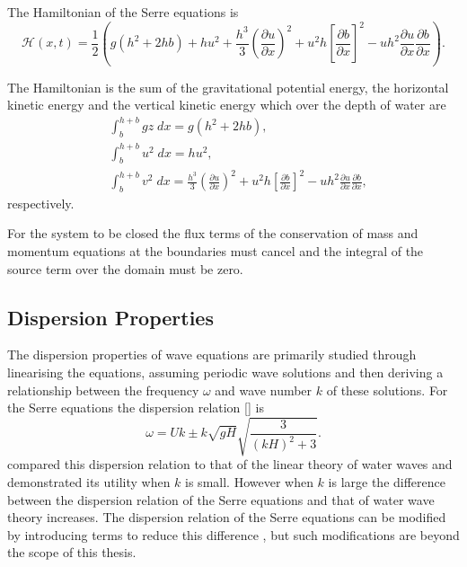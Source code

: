 \begin{defn}
	\label{eqn:Hamildef}
	The Hamiltonian \cite{Green-Naghdi-1976-237,Li-Y-2002} of the Serre equations is
	\begin{equation*}
		\mathcal{H}(x,t) = \frac{1}{2} \left( g\left(h^2 + 2hb\right) + hu^2  + \frac{h^3}{3} \left(\frac{\partial u}{\partial x}\right)^2 + u^2h\left[\frac{\partial b}{\partial x}\right]^2 - uh^2 \frac{\partial u}{\partial x} \frac{\partial b}{\partial x}  \right).
	\end{equation*}
\end{defn}
The Hamiltonian is the sum of the gravitational potential energy, the horizontal kinetic energy and the vertical kinetic energy which over the depth of water are
\begin{align}
& \int_{b}^{h +b} gz \; dx = g\left(h^2 + 2hb\right), \\
& \int_{b}^{h +b} u^2 \; dx = hu^2, \\
& \int_{b}^{h +b} v^2 \; dx = \frac{h^3}{3} \left(\frac{\partial u}{\partial x}\right)^2 + u^2h\left[\frac{\partial b}{\partial x}\right]^2 - uh^2 \frac{\partial u}{\partial x} \frac{\partial b}{\partial x},
\end{align}
respectively. 
 
For the system to be closed the flux terms of the conservation of mass and momentum equations at the boundaries must cancel and the integral of the source term over the domain must be zero.

\subsection{Dispersion Properties}
The dispersion properties of wave equations are primarily studied through linearising the equations, assuming periodic wave solutions and then deriving a relationship between the frequency $\omega$ and wave number $k$ of these solutions. For the Serre equations the dispersion relation [] is
\begin{equation}
\label{eqn:DispersionRelation}
\omega = Uk \pm k \sqrt{gH} \sqrt{\frac{3}{\left(kH\right)^2 + 3}}.
\end{equation}
\citet{Barthelemy-2004-315} compared this dispersion relation to that of the linear theory of water waves and demonstrated its utility when $k$ is small. However when $k$ is large the difference between the dispersion relation of the Serre equations and that of water wave theory increases. The dispersion relation of the Serre equations can be modified by introducing terms to reduce this difference \cite{Barthelemy-2004-315}, but such modifications are beyond the scope of this thesis.


